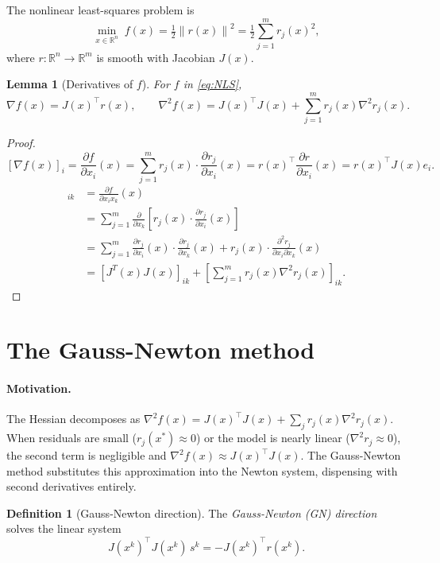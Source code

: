 \documentclass[11pt,a4paper]{report}
\theoremstyle{plain}
\newtheorem{lemma}[theorem]{Lemma}
\theoremstyle{definition}
\newtheorem{definition}[theorem]{Definition}
\newcommand{\R}{\mathbb{R}}
\newcommand{\norm}[1]{\left\lVert#1\right\rVert}
\newcommand{\grad}{\nabla}
\newcommand{\hess}{\nabla^{2}}
\newcommand{\trans}{^{\top}}
\begin{document}
The nonlinear least-squares problem is
\begin{equation}\label{eq:NLS}
\min_{x\in\R^{n}}\; f(x)=\tfrac12\norm{r(x)}^{2}=\tfrac12\sum_{j=1}^{m}r_{j}(x)^{2},
\end{equation}
where $r:\R^{n}\to\R^{m}$ is smooth with Jacobian $J(x)$.

\begin{lemma}[Derivatives of $f$]\label{lem:NLS-deriv}
For $f$ in \eqref{eq:NLS},
\[
\grad f(x)=J(x)\trans r(x),\qquad
\hess f(x)=J(x)\trans J(x)+\sum_{j=1}^{m}r_{j}(x)\hess r_{j}(x).
\]
\end{lemma}
\begin{proof}
  \[
    [\grad f(x)]_i = \frac{\partial f}{\partial x_i}(x) = \sum_{j = 1}^m r_j(x) \cdot \frac{\partial r_j}{\partial x_i}(x) = r(x)\trans \frac{\partial r}{\partial x_i}(x) = r(x)\trans J(x)e_i.
  \]
  \begin{align*}
    [\hess f(x)]_{ik} 
    &= \frac{\partial f}{\partial x_i x_k}(x) \\
    &= \sum_{j = 1}^m \frac{\partial}{\partial x_k} \left[r_j(x) \cdot \frac{\partial r_j}{\partial x_i}(x)\right] \\
    &= \sum_{j = 1}^m \frac{\partial r_j}{\partial x_i}(x) \cdot \frac{\partial r_j}{\partial x_k}(x) + r_j(x) \cdot \frac{\partial^2 r_j}{\partial x_i \partial x_k}(x) \\
    &= [J^T(x)J(x)]_{ik} + \left[\sum_{j=1}^{m}r_{j}(x)\hess r_{j}(x)\right]_{ik}.
  \end{align*}
\end{proof}

\section{The Gauss-Newton method}

\paragraph{Motivation.} The Hessian decomposes as $\hess f(x)=J(x)\trans J(x)
+\sum_{j}r_{j}(x)\hess r_{j}(x)$. When residuals are small ($r_{j}(x^{*})\approx 0$)
or the model is nearly linear ($\hess r_{j}\approx 0$), the second term is
negligible and $\hess f(x)\approx J(x)\trans J(x)$. The Gauss-Newton method
substitutes this approximation into the Newton system, dispensing with second
derivatives entirely.

\begin{definition}[Gauss-Newton direction]
The \emph{Gauss-Newton (GN) direction} solves the linear system
\begin{equation}\label{eq:GN}
J(x^{k})\trans J(x^{k})\,s^{k}=-J(x^{k})\trans r(x^{k}).
\end{equation}
\end{definition}
\end{document}
